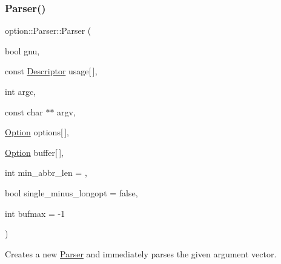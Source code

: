 \subsubsection{\texorpdfstring{Parser()}{Parser()}}
{\footnotesize\ttfamily option\+::\+Parser\+::\+Parser (\begin{DoxyParamCaption}\item[{bool}]{gnu,  }\item[{const \hyperlink{structoption_1_1_descriptor}{Descriptor}}]{usage\mbox{[}$\,$\mbox{]},  }\item[{int}]{argc,  }\item[{const char $\ast$$\ast$}]{argv,  }\item[{\hyperlink{classoption_1_1_option}{Option}}]{options\mbox{[}$\,$\mbox{]},  }\item[{\hyperlink{classoption_1_1_option}{Option}}]{buffer\mbox{[}$\,$\mbox{]},  }\item[{int}]{min\+\_\+abbr\+\_\+len = {},  }\item[{bool}]{single\+\_\+minus\+\_\+longopt = {\ttfamily false},  }\item[{int}]{bufmax = {\ttfamily -\/1} }\end{DoxyParamCaption})\hspace{0.3cm}{\ttfamily [inline]}}



Creates a new \hyperlink{classoption_1_1_parser}{Parser} and immediately parses the given argument vector. 


